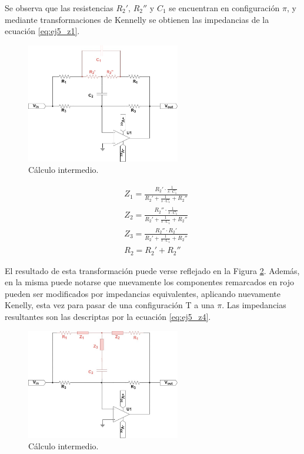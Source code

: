 Se observa que las resistencias $R_2'$, $R_2''$ y $C_1$ se encuentran en configuración $\pi$, y mediante transformaciones de Kennelly se obtienen las impedancias 
de la ecuación \ref{eq:ej5_z1}.
\begin{figure}[H]
    \centering
    \includegraphics[width=0.6\textwidth]{../EJ5/latex_resources/Z1_2_and_3}
    \caption{Cálculo intermedio.}
    \label{fig:Z123}
\end{figure}

\begin{align}
    &Z_1 = \frac{R_2' \cdot \frac{1}{s \cdot C_1}}{R_2' + \frac{1}{s \cdot C_1} + R_2''}  \label{eq:ej5_z1} \\
    &Z_2 = \frac{R_2'' \cdot \frac{1}{s \cdot C_1}}{R_2' + \frac{1}{s \cdot C_1} + R_2''}  \label{eq:ej5_z2} \\
    &Z_3 = \frac{R_2'' \cdot R_2'}{R_2' + \frac{1}{s \cdot C_1} + R_2''}  \label{eq:ej5_z3} \\
    &R_2 = R_2' + R_2'' \label{eq:ej5_r2}
\end{align}

El resultado de esta transformación puede verse reflejado en la Figura \ref{fig:Z456}.
Además, en la misma puede notarse que nuevamente los componentes remarcados en rojo pueden ser modificados por impedancias equivalentes, aplicando nuevamente Kenelly, 
esta vez para pasar de una configuración T a una $\pi$.
Las impedancias resultantes son las descriptas por la ecuación \ref{eq:ej5_z4}.
\begin{figure}[H]
    \centering
    \includegraphics[width=0.6\textwidth]{../EJ5/latex_resources/Z4_5_and_6}
    \caption{Cálculo intermedio.}
    \label{fig:Z456}
\end{figure}

